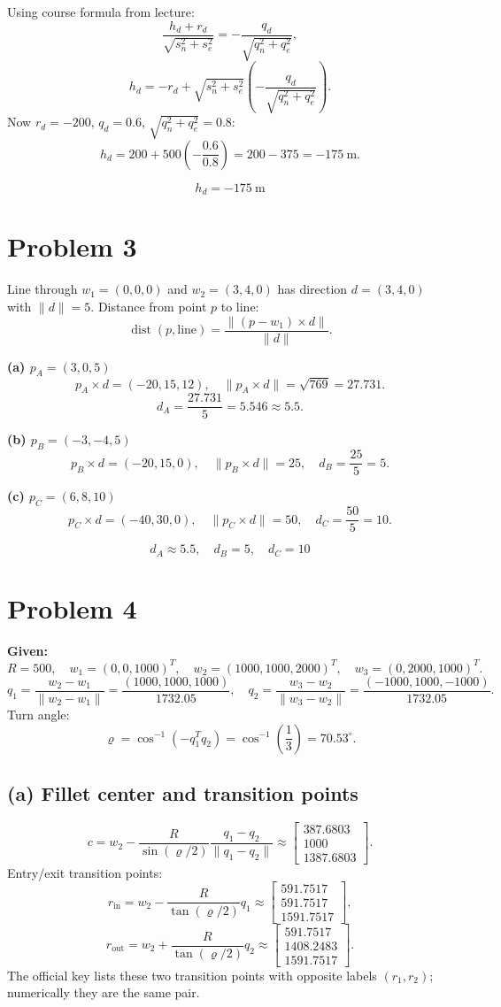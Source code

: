 \documentclass[11pt,a4paper]{article}
\begin{document}
Using course formula from lecture:
\[
\frac{h_d+r_d}{\sqrt{s_n^2+s_e^2}}
=-\frac{q_d}{\sqrt{q_n^2+q_e^2}},
\]
\[
h_d=-r_d+\sqrt{s_n^2+s_e^2}\left(-\frac{q_d}{\sqrt{q_n^2+q_e^2}}\right).
\]
Now $r_d=-200$, $q_d=0.6$, $\sqrt{q_n^2+q_e^2}=0.8$:
\[
h_d=200+500\left(-\frac{0.6}{0.8}\right)=200-375=-175~\text{m}.
\]

\[
\boxed{h_d=-175~\text{m}}
\]

\section{Problem 3}
Line through $w_1=(0,0,0)$ and $w_2=(3,4,0)$ has direction $d=(3,4,0)$ with $\|d\|=5$.
Distance from point $p$ to line:
\[
\operatorname{dist}(p,\text{line})=\frac{\|(p-w_1)\times d\|}{\|d\|}.
\]

\textbf{(a) $p_A=(3,0,5)$}
\[
p_A\times d=(-20,15,12),\quad \|p_A\times d\|=\sqrt{769}=27.731.
\]
\[
d_A=\frac{27.731}{5}=5.546\approx 5.5.
\]

\textbf{(b) $p_B=(-3,-4,5)$}
\[
p_B\times d=(-20,15,0),\quad \|p_B\times d\|=25,\quad d_B=\frac{25}{5}=5.
\]

\textbf{(c) $p_C=(6,8,10)$}
\[
p_C\times d=(-40,30,0),\quad \|p_C\times d\|=50,\quad d_C=\frac{50}{5}=10.
\]

\[
\boxed{d_A\approx 5.5,\quad d_B=5,\quad d_C=10}
\]

\section{Problem 4}
\textbf{Given:}
\[
R=500,\quad
w_1=(0,0,1000)^T,\quad
w_2=(1000,1000,2000)^T,\quad
w_3=(0,2000,1000)^T.
\]
\[
q_1=\frac{w_2-w_1}{\|w_2-w_1\|}=\frac{(1000,1000,1000)}{1732.05},
\quad
q_2=\frac{w_3-w_2}{\|w_3-w_2\|}=\frac{(-1000,1000,-1000)}{1732.05}.
\]
Turn angle:
\[
\varrho=\cos^{-1}(-q_1^Tq_2)=\cos^{-1}\!\left(\frac13\right)=70.53^\circ.
\]

\subsection*{(a) Fillet center and transition points}
\[
c=w_2-\frac{R}{\sin(\varrho/2)}\frac{q_1-q_2}{\|q_1-q_2\|}
\approx
\begin{bmatrix}
387.6803\\1000\\1387.6803
\end{bmatrix}.
\]
Entry/exit transition points:
\[
r_{\text{in}}=w_2-\frac{R}{\tan(\varrho/2)}q_1
\approx
\begin{bmatrix}
591.7517\\591.7517\\1591.7517
\end{bmatrix},
\]
\[
r_{\text{out}}=w_2+\frac{R}{\tan(\varrho/2)}q_2
\approx
\begin{bmatrix}
591.7517\\1408.2483\\1591.7517
\end{bmatrix}.
\]
The official key lists these two transition points with opposite labels $(r_1,r_2)$; numerically they are the same pair.
\end{document}
